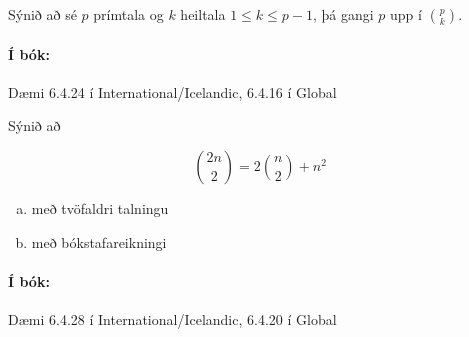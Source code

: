 \documentclass{article}
\begin{document}
\question Sýnið að sé $p$ prímtala og $k$ heiltala $1 \leq k \leq p-1$, þá gangi $p$ upp í $\binom{p}{k}$.

\paragraph{Í bók:} Dæmi 6.4.24 í International/Icelandic, 6.4.16 í Global

\question Sýnið að

\[
    \binom{2n}{2} = 2\binom{n}{2} + n^2
\]

\begin{enumerate}[a)]
    \item með tvöfaldri talningu
    \item með bókstafareikningi
\end{enumerate}

\paragraph{Í bók:} Dæmi 6.4.28 í International/Icelandic, 6.4.20 í Global
\end{document}
